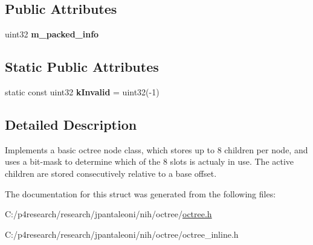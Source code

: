 \subsection*{\-Public \-Attributes}
\begin{DoxyCompactItemize}
\item 
\hypertarget{structnih_1_1_octree__node__base_ac966c44090fa40fa5bbcb4763a1caa7f}{
uint32 {\bfseries m\-\_\-packed\-\_\-info}}
\label{structnih_1_1_octree__node__base_ac966c44090fa40fa5bbcb4763a1caa7f}

\end{DoxyCompactItemize}
\subsection*{\-Static \-Public \-Attributes}
\begin{DoxyCompactItemize}
\item 
\hypertarget{structnih_1_1_octree__node__base_af2fecba21029dfb0ebfea1313d36727e}{
static const uint32 {\bfseries k\-Invalid} = uint32(-\/1)}
\label{structnih_1_1_octree__node__base_af2fecba21029dfb0ebfea1313d36727e}

\end{DoxyCompactItemize}


\subsection{\-Detailed \-Description}
\-Implements a basic octree node class, which stores up to 8 children per node, and uses a bit-\/mask to determine which of the 8 slots is actualy in use. \-The active children are stored consecutively relative to a base offset. 

\-The documentation for this struct was generated from the following files\-:\begin{DoxyCompactItemize}
\item 
\-C\-:/p4research/research/jpantaleoni/nih/octree/\hyperlink{octree_8h}{octree.\-h}\item 
\-C\-:/p4research/research/jpantaleoni/nih/octree/octree\-\_\-inline.\-h\end{DoxyCompactItemize}
